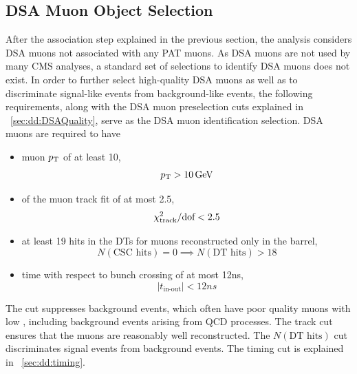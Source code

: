\subsection{DSA Muon Object Selection}
\label{sec:dd:DSAObject}
After the \DSAToPAT association step explained in the previous section, the analysis considers DSA muons not associated with any PAT muons.
As DSA muons are not used by many CMS analyses, a standard set of selections to identify DSA muons does not exist.
In order to further select high-quality DSA muons as well as to discriminate signal-like events from background-like events, the following requirements, along with the DSA muon preselection cuts explained in \Sec~\ref{sec:dd:DSAQuality}, serve as the DSA muon identification selection.
DSA muons are required to have
\begin{itemize}
  \item muon $p_{\mathrm{T}}$ of at least 10\GeV, \ie $$p_{\mathrm{T}} > 10\,\text{Ge\hspace{-.08em}V}$$
  \item \normchisq of the muon track fit of at most 2.5, \ie $$\chi^{2}_\text{track}/\text{dof} < 2.5$$
  \item at least 19 hits in the DTs for muons reconstructed only in the barrel, \ie $$N(\text{CSC hits}) = 0 \implies N(\text{DT hits}) > 18$$
  \item time with respect to bunch crossing of at most 12\unit{ns}, \ie $$|t_\text{in-out}| < 12\unit{ns}$$
\end{itemize}

The \pT cut suppresses background events, which often have poor quality muons with low \pT, including background events arising from QCD processes.
The track \normchisq cut ensures that the muons are reasonably well reconstructed.
The $N(\text{DT hits})$ cut discriminates signal events from background events.
The timing cut is explained in \Sec~\ref{sec:dd:timing}.

\pagebreak
